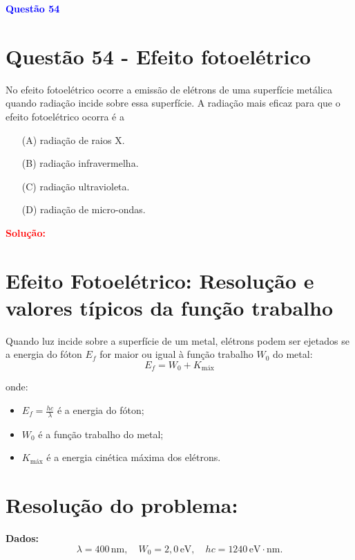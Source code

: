 \documentclass[a4paper,12pt]{article}
\begin{document}
\begin{flushleft}
\textbf{\textcolor{blue}{\Large Quest\~ao 54}}\\
\noindent
\section{Quest\~ao 54 - Efeito fotoelétrico}
No efeito fotoelétrico ocorre a emissão de elétrons de uma
superfície metálica quando radiação incide sobre essa
superfície. A radiação mais eficaz para que o efeito
fotoelétrico ocorra é a

\begin{itemize}
\item[(A)] radiação de raios X.
\item[(B)] radiação infravermelha.
\item[(C)] radiação ultravioleta.
\item[(D)] radiação de micro-ondas.
\end{itemize}

\vspace{0.5cm}

\textcolor{red}{\textbf{Solução:}}\\

\section*{Efeito Fotoelétrico: Resolução e valores típicos da função trabalho}

Quando luz incide sobre a superfície de um metal, elétrons podem ser ejetados se a energia do fóton \( E_f \) for maior ou igual à função trabalho \( W_0 \) do metal:
\[
E_f = W_0 + K_{\text{máx}}
\]

onde:
\begin{itemize}
    \item \( E_f = \frac{hc}{\lambda} \) é a energia do fóton;
    \item \( W_0 \) é a função trabalho do metal;
    \item \( K_{\text{máx}} \) é a energia cinética máxima dos elétrons.
\end{itemize}

\section*{Resolução do problema:}

\textbf{Dados:}
\[
\lambda = 400\,\mathrm{nm}, \quad W_0 = 2{,}0\,\mathrm{eV}, \quad hc = 1240\,\mathrm{eV\cdot nm}.
\]


\end{flushleft}
\end{document}
